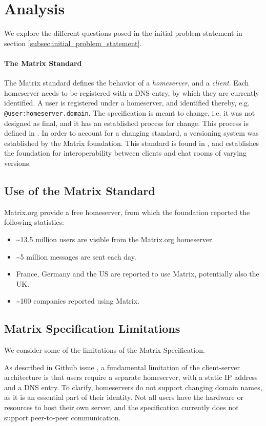 \section{Analysis}
We explore the different questions posed in the initial problem statement in section \ref{subsec:initial_problem_statement}.

\paragraph{The Matrix Standard} The Matrix standard defines the behavior of a \textit{homeserver}, and a \textit{client}\cite{matrix_org_spec}.
Each homeserver needs to be registered with a DNS entry, by which they are currently identified.
A user is registered under a homeserver, and identified thereby, e.g. \texttt{@user:homeserver.domain}.
The specification is meant to change, i.e. it was not designed as final, and it has an established process for change.
This process is defined in \cite{matrix_org_spec_changes}.
In order to account for a changing standard, a versioning system was established by the Matrix foundation.
This standard is found in \cite{matrix_org_spec}, and establishes the foundation for interoperability between clients and chat rooms of varying versions.

\subsection{Use of the Matrix Standard}
Matrix.org provide a free homeserver, from which the foundation reported the following statistics\cite{fosdem_event_p2p_matrix}:
\begin{itemize}
    \item \textasciitilde{}13.5 million users are visible from the Matrix.org homeserver.
    \item \textasciitilde{}5 million messages are sent each day.
    \item France, Germany and the US are reported to use Matrix, potentially also the UK.
    \item \textasciitilde{}100 companies reported using Matrix.
\end{itemize}

\subsection{Matrix Specification Limitations}
We consider some of the limitations of the Matrix Specification.

As described in Github issue \cite{github_matrix_170}, a fundamental limitation of the client-server architecture is that users require a separate homeserver, with a static IP address and a DNS entry.
To clarify, homeservers do not support changing domain names, as it is an essential part of their identity.
Not all users have the hardware or resources to host their own server, and the specification currently does not support peer-to-peer communication.

